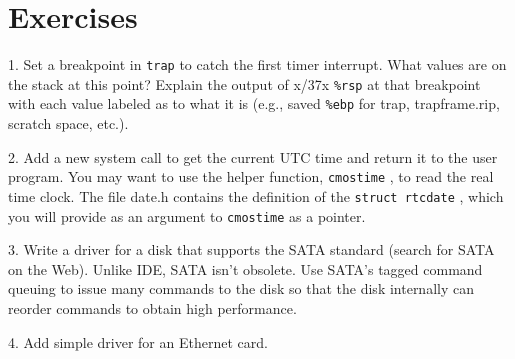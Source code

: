 \section{Exercises}

1. Set a breakpoint in
\lstinline{trap}
to catch the first timer interrupt. What values are on the stack at this
point?  Explain the output of x/37x
\texttt{\%rsp}
at that breakpoint with each value
labeled as to what it is (e.g., saved
\texttt{\%ebp}
for trap, trapframe.rip, scratch space, etc.).

2.  Add a new system call to get the current UTC time and return it to the user
program. You may want to use the helper function,
\lstinline{cmostime}
,
to read the real time clock. The file date.h contains the definition
of the
\lstinline{struct rtcdate}
,
which you will provide as an argument to
\lstinline{cmostime}
as a pointer.

3. Write a driver for a disk that supports the SATA standard (search for SATA on
the Web). Unlike IDE, SATA isn't obsolete.  Use SATA's tagged command queuing to
issue many commands to the disk so that the disk internally can reorder commands
to obtain high performance.

4. Add simple driver for an Ethernet card.
